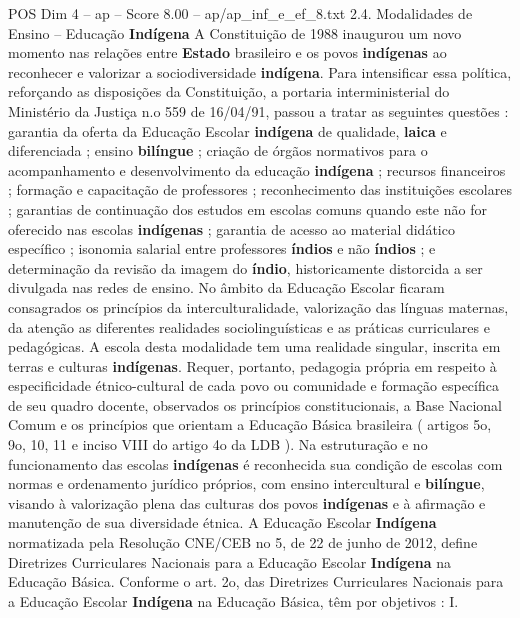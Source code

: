 \begin{textsample}{POS Dim 4 – ap – Score 8.00 – ap/ap\_inf\_e\_ef\_8.txt}  \label{ex:f4_pos_236}
2.4.
Modalidades de Ensino – Educação \textbf{Indígena} A Constituição de 1988 inaugurou um novo momento nas relações entre \textbf{Estado} brasileiro e os povos \textbf{indígenas} ao reconhecer e valorizar a sociodiversidade \textbf{indígena}.
Para intensificar essa política, reforçando as disposições da Constituição, a portaria interministerial do Ministério da Justiça n.o 559 de 16/04/91, passou a tratar as seguintes questões : garantia da oferta da Educação Escolar \textbf{indígena} de qualidade, \textbf{laica} e diferenciada ; ensino \textbf{bilíngue} ; criação de órgãos normativos para o acompanhamento e desenvolvimento da educação \textbf{indígena} ; recursos financeiros ; formação e capacitação de professores ; reconhecimento das instituições escolares ; garantias de continuação dos estudos em escolas comuns quando este não for oferecido nas escolas \textbf{indígenas} ; garantia de acesso ao material didático específico ; isonomia salarial entre professores \textbf{índios} e não \textbf{índios} ; e determinação da revisão da imagem do \textbf{índio}, historicamente distorcida a ser divulgada nas redes de ensino.
No âmbito da Educação Escolar ficaram consagrados os princípios da interculturalidade, valorização das línguas maternas, da atenção as diferentes realidades sociolinguísticas e as práticas curriculares e pedagógicas.
A escola desta modalidade tem uma realidade singular, inscrita em terras e culturas \textbf{indígenas}.
Requer, portanto, pedagogia própria em respeito à especificidade étnico-cultural de cada povo ou comunidade e formação específica de seu quadro docente, observados os princípios constitucionais, a Base Nacional Comum e os princípios que orientam a Educação Básica brasileira ( artigos 5o, 9o, 10, 11 e inciso VIII do artigo 4o da LDB ).
Na estruturação e no funcionamento das escolas \textbf{indígenas} é reconhecida sua condição de escolas com normas e ordenamento jurídico próprios, com ensino intercultural e \textbf{bilíngue}, visando à valorização plena das culturas dos povos \textbf{indígenas} e à afirmação e manutenção de sua diversidade étnica.
A Educação Escolar \textbf{Indígena} normatizada pela Resolução CNE/CEB no 5, de 22 de junho de 2012, define Diretrizes Curriculares Nacionais para a Educação Escolar \textbf{Indígena} na Educação Básica.
Conforme o art. 2o, das Diretrizes Curriculares Nacionais para a Educação Escolar \textbf{Indígena} na Educação Básica, têm por objetivos : I.

\end{textsample}
